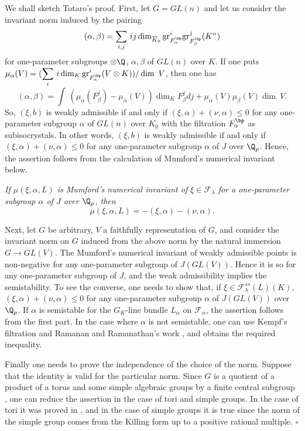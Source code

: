 We shall sketch Totaro's proof. 
First, let $G = GL(n)$ and let us consider the invariant norm 
induced by the pairing 
$$
    (\alpha, \beta) = \displaystyle{\mathop{\sum}_{i, j}}\ 
 ij \dim_{\overline{K}_0} 
\mathrm{gr}_{F_\alpha^{\bp}}^i\mathrm{gr}_{F_\beta^{\bp}}^j 
             (K^n) 
$$
for one-parameter subgroups $\otimes \Q$, $\alpha, \beta$ of 
$GL(n)$ over $K$. 
If one puts $\mu_\alpha(V) 
= (\displaystyle{\mathop{\sum}_i}\ i\dim_K 
\mathrm{gr}_{F_\alpha^{\bp}}^i(V \otimes K)) /\dim\ V$, 
then one has 
$$
     (\alpha, \beta) 
              = \int\ (\mu_\alpha(F_\beta^j) - \mu_\alpha(V))\dim_K 
F_\beta^j dj 
                      + \mu_\alpha(V)\mu_\beta(V)\dim\ V.
$$
So, $(\xi, b)$ is weakly admissible 
if and only if $(\xi, \alpha) + (\nu, \alpha) \leq 0$ 
for any one-parameter subgroup $\alpha$ of $GL(n)$ over $K_0$ 
with the filtration $F_\alpha^{\bp}$ as subisocrystals. 
In other words, $(\xi, b)$ is weakly admissible 
if and only if $(\xi, \alpha) + (\nu, \alpha) \leq 0$ 
for any one-parameter subgroup $\alpha$ of $J$ over $\Q_p$. 
Hence, the assertion follows from the calculation of Mumford's numerical 
invariant below. 

\begin{applem}
 {\it If $\mu(\xi, \alpha, L)$ is Mumford's numerical 
 invariant of $\xi \in {\mathcal F}_\lambda$ 
 for a one-parameter subgroup $\alpha$ of $J$ over $\Q_p$, then 
 $$
    \mu(\xi, \alpha, L) = - (\xi, \alpha) - (\nu, \alpha).
 $$
 }
\end{applem}

Next, let $G$ be arbitrary, $V$ a faithfully representation of $G$, and 
consider the invariant norm on $G$ induced from the above norm 
by the natural immersion $G \rightarrow GL(V)$. 
The Mumford's numerical invariant of weakly admissible points 
is non-negative for any one-parameter subgroup of $J(GL(V))$. 
Hence it is so for any one-parameter subgroup of $J$, 
and the weak admissibility implies the semistability. 
To see the converse, one needs to show that, if $\xi \in {\mathcal 
F}_\lambda^{ss}(L)(K)$, 
$(\xi, \alpha) + (\nu, \alpha) \leq 0$ 
for any one-parameter subgroup $\alpha$ of $J(GL(V))$ over $\Q_p$. 
If $\alpha$ is semistable for the $G_K$-line bundle $L_\alpha$ 
on ${\mathcal F}_\alpha$, the assertion follows from the first part. 
In the case where $\alpha$ is not semistable, one can use 
Kempf's filtration \cite{iiit} and Ramanan and Ramanathan's work 
\cite{srotif}, and obtains the required inequality. 

Finally one needs to prove the independence of the choice of the norm.
Suppose that the identity is valid for the particular norm.
Since $G$ is a quotient of a product of a torus and some simple algebraic
groups
by a finite central subgroup \cite{gr},
one can reduce the assertion in the case of tori and simple groups.
In the case of tori it was proved in \cite{psfpg},
and in the case of simple groups it is true
since the norm of the simple group
comes from the Killing form up to a positive rational multiple.
\hspace{\fill} $\square$

